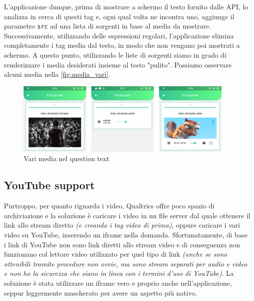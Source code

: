 L'applicazione dunque, prima di mostrare a schermo il testo fornito dalle API, lo analizza in cerca di questi tag e, ogni qual volta ne incontra uno, aggiunge il parametro \texttt{src} ad una lista di sorgenti in base al media da mostrare. Successivamente, utilizzando delle espressioni regolari, l'applicazione elimina completamente i tag media dal testo, in modo che non vengano poi mostrati a schermo. A questo punto, utilizzando le liste di sorgenti siamo in grado di renderizzare i media desiderati insieme al testo "pulito". Possiamo osservare alcuni media nella \autoref{fig:media_vari}.

\begin{figure}[h!]
\centering
\includegraphics[width=0.95\textwidth]{img/media_vari}
\caption{Vari media nel question text}
\label{fig:media_vari}
\end{figure}

\subsection{YouTube support}
Purtroppo, per quanto riguarda i video, Qualtrics offre poco spazio di archiviazione e la soluzione è caricare i video in un file server dal quale ottenere il link allo stream diretto \textit{(e creando i tag video di prima)}, oppure caricare i vari video su YouTube, inserendo un iframe nella domanda. Sfortunatamente, di base i link di YouTube non sono link diretti allo stream video e di conseguenza non funzionano col lettore video utilizzato per quel tipo di link \textit{(anche se sono ottenibili tramite procedure non ovvie, ma sono stream separati per audio e video e non ho la sicurezza che siano in linea con i termini d'uso di YouTube)}. La soluzione è stata utilizzare un iframe vero e proprio anche nell'applicazione, seppur leggermente mascherato per avere un aspetto più nativo.

